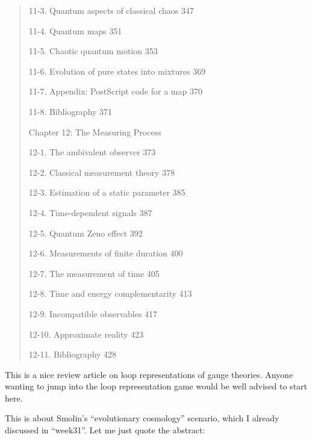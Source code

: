 \documentclass{article}
\def\tightlist{}
\renewcommand{\texttt}[1]{%
  \begingroup
  \ttfamily
  \begingroup\lccode`~=`/\lowercase{\endgroup\def~}{/\discretionary{}{}{}}%
  \begingroup\lccode`~=`[\lowercase{\endgroup\def~}{[\discretionary{}{}{}}%
  \begingroup\lccode`~=`.\lowercase{\endgroup\def~}{.\discretionary{}{}{}}%
  \catcode`/=\active\catcode`[=\active\catcode`.=\active
  \scantokens{#1\noexpand}%
  \endgroup
}
\begin{document}
\begin{quote}
11-3. Quantum aspects of classical chaos 347

11-4. Quantum maps 351

11-5. Chaotic quantum motion 353

11-6. Evolution of pure states into mixtures 369

11-7. Appendix: PostScript code for a map 370

11-8. Bibliography 371

Chapter 12: The Measuring Process

12-1. The ambivalent observer 373

12-2. Classical measurement theory 378

12-3. Estimation of a static parameter 385

12-4. Time-dependent signals 387

12-5. Quantum Zeno effect 392

12-6. Measurements of finite duration 400

12-7. The measurement of time 405

12-8. Time and energy complementarity 413

12-9. Incompatible observables 417

12-10. Approximate reality 423

12-11. Bibliography 428
\end{quote}


This is a nice review article on loop representations of gauge theories.
Anyone wanting to jump into the loop representation game would be well
advised to start here.


This is about Smolin's ``evolutionary cosmology'' scenario, which I
already discussed in ``week31''. Let me just quote the abstract:
\end{document}
